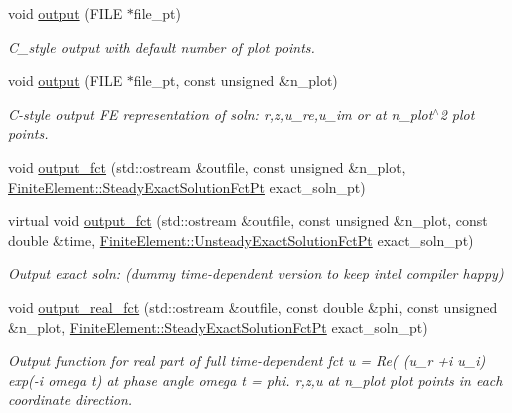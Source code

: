 \begin{DoxyCompactItemize}
void \hyperlink{classoomph_1_1PMLFourierDecomposedHelmholtzEquationsBase_a476275fe7a2c10a33e21d17d05ead9fc}{output} (F\+I\+LE $\ast$file\+\_\+pt)
\begin{DoxyCompactList}\small\item\em C\+\_\+style output with default number of plot points. \end{DoxyCompactList}\item 
void \hyperlink{classoomph_1_1PMLFourierDecomposedHelmholtzEquationsBase_a030cedd092d7824d8bc060f960fef3d2}{output} (F\+I\+LE $\ast$file\+\_\+pt, const unsigned \&n\+\_\+plot)
\begin{DoxyCompactList}\small\item\em C-\/style output FE representation of soln\+: r,z,u\+\_\+re,u\+\_\+im or at n\+\_\+plot$^\wedge$2 plot points. \end{DoxyCompactList}\item 
void \hyperlink{classoomph_1_1PMLFourierDecomposedHelmholtzEquationsBase_af04cd5b7a06c1f6eb28c013d2f250677}{output\+\_\+fct} (std\+::ostream \&outfile, const unsigned \&n\+\_\+plot, \hyperlink{classoomph_1_1FiniteElement_a690fd33af26cc3e84f39bba6d5a85202}{Finite\+Element\+::\+Steady\+Exact\+Solution\+Fct\+Pt} exact\+\_\+soln\+\_\+pt)
\item 
virtual void \hyperlink{classoomph_1_1PMLFourierDecomposedHelmholtzEquationsBase_acde47c8580702187e2663c08c243e126}{output\+\_\+fct} (std\+::ostream \&outfile, const unsigned \&n\+\_\+plot, const double \&time, \hyperlink{classoomph_1_1FiniteElement_ad4ecf2b61b158a4b4d351a60d23c633e}{Finite\+Element\+::\+Unsteady\+Exact\+Solution\+Fct\+Pt} exact\+\_\+soln\+\_\+pt)
\begin{DoxyCompactList}\small\item\em Output exact soln\+: (dummy time-\/dependent version to keep intel compiler happy) \end{DoxyCompactList}\item 
void \hyperlink{classoomph_1_1PMLFourierDecomposedHelmholtzEquationsBase_a40f2098b3f58dd2414e9de4ab4966a61}{output\+\_\+real\+\_\+fct} (std\+::ostream \&outfile, const double \&phi, const unsigned \&n\+\_\+plot, \hyperlink{classoomph_1_1FiniteElement_a690fd33af26cc3e84f39bba6d5a85202}{Finite\+Element\+::\+Steady\+Exact\+Solution\+Fct\+Pt} exact\+\_\+soln\+\_\+pt)
\begin{DoxyCompactList}\small\item\em Output function for real part of full time-\/dependent fct u = Re( (u\+\_\+r +i u\+\_\+i) exp(-\/i omega t) at phase angle omega t = phi. r,z,u at n\+\_\+plot plot points in each coordinate direction. \end{DoxyCompactList}\item 

\end{DoxyCompactItemize}
